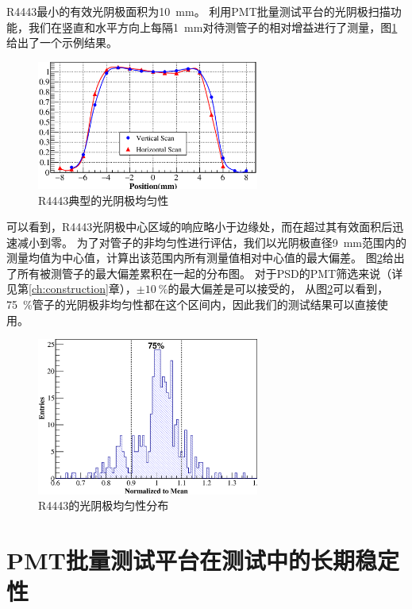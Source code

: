 R4443最小的有效光阴极面积为\SI{10}{mm}。
利用PMT批量测试平台的光阴极扫描功能，我们在竖直和水平方向上每隔\SI{1}{mm}对待测管子的相对增益进行了测量，图\ref{fig:pmt_test:cathode_uniformity}给出了一个示例结果。
\begin{figure}[htbp]
	\centering
	\includegraphics[width=0.65\textwidth]{chap/pmt_test/fig/cathode_uniformity.eps}
	\caption{R4443典型的光阴极均匀性}
	\label{fig:pmt_test:cathode_uniformity}
\end{figure}
可以看到，R4443光阴极中心区域的响应略小于边缘处，而在超过其有效面积后迅速减小到零。
为了对管子的非均匀性进行评估，我们以光阴极直径\SI{9}{mm}范围内的测量均值为中心值，计算出该范围内所有测量值相对中心值的最大偏差。
图\ref{fig:pmt_test:cathode_uniformity_distribution}给出了所有被测管子的最大偏差累积在一起的分布图。
对于PSD的PMT筛选来说（详见第\ref{ch:construction}章），$\pm\SI{10}{\percent}$的最大偏差是可以接受的，
从图\ref{fig:pmt_test:cathode_uniformity_distribution}可以看到，\SI{75}{\percent}管子的光阴极非均匀性都在这个区间内，因此我们的测试结果可以直接使用。

\begin{figure}[htbp]
	\centering
	\includegraphics[width=0.65\textwidth]{chap/pmt_test/fig/cathode_uniformity_distribution.eps}
	\caption{R4443的光阴极均匀性分布}
	\label{fig:pmt_test:cathode_uniformity_distribution}
\end{figure}

\section{PMT批量测试平台在测试中的长期稳定性}
\label{sec:pmt_test:testbench_performance}

